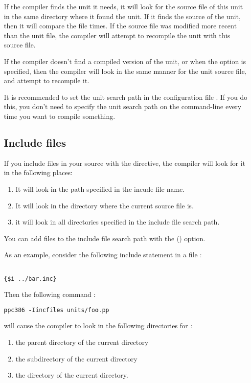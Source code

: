 \documentclass{report}
\begin{document}
If the compiler finds the unit it needs, it will look for the source file of
this unit in the same directory where it found the unit.
If it finds the source of the unit, then it will compare the file times.
If the source file was modified more recent than the unit file, the
compiler will attempt to recompile the unit with this source file.

If the compiler doesn't find a compiled version of the unit, or when the
 option is specified, then the compiler will look in the same
manner for the unit source file, and attempt to recompile it.

It is recommended to set the unit search path in the configuration file
. If you do this, you don't need to specify the unit search
path on the command-line every time you want to compile something.

\subsection{Include files}
If you include files in your source with the 
directive, the compiler will look for it in the following places:

\begin{enumerate}
\item It will look in the path specified in the incude file name.
\item It will look in the directory where the current source file is.
\item it will look in all directories specified in the include file search
path.
\end{enumerate}
You can add files to the include file search
 path with the  ()
option.

As an example, consider the following include statement in a file
:
\begin{verbatim}

{$i ../bar.inc}

\end{verbatim}
Then the following command :
\begin{verbatim}
ppc386 -Iincfiles units/foo.pp
\end{verbatim}
will cause the compiler to look in the following directories for
:
\begin{enumerate}
\item the parent directory of the current directory
\item the  subdirectory of the current directory
\item the  directory of the current directory.
\end{enumerate}
\end{document}
